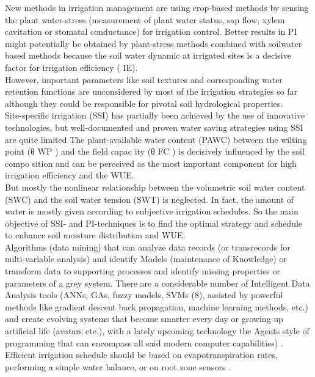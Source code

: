 \documentclass[letterpaper, 10 pt, conference]{ieeeconf}  %
\begin{document}
New methods in irrigation management are using crop-based methods by sensing the plant water-stress (measurement of plant water status, sap flow, xylem cavitation or stomatal conductance) for irrigation control. Better results in PI might potentially be obtained by plant-stress methods combined with soilwater based methods because the soil water dynamic at irrigated sites is a decisive factor for irrigation efficiency ( IE)\cite{Grashey-Jansen2014}.\\
However, important parameters like soil textures and corresponding water retention functions are unconsidered by most of the irrigation strategies so far although they could be responsible for pivotal soil hydrological properties\cite{Grashey-Jansen2014}.\\
Site-specific irrigation (SSI) has partially been achieved by the use of innovative technologies, but well-documented and proven water saving strategies using SSI are quite limited
The plant-available water content (PAWC) between the wilting point (θ WP ) and the field capac ity (θ FC ) is decisively influenced by the soil compo sition and can be perceived as the most important component for high irrigation efficiency and the WUE\cite{Grashey-Jansen2014}.\\

But mostly the nonlinear relationship between the volumetric soil water content (SWC) and the soil water tension (SWT) is neglected. In fact, the amount of water is mostly given according to subjective irrigation schedules. So the main objective of SSI- and PI-techniques is to find the optimal strategy and schedule to enhance soil moisture distribution and WUE\cite{Grashey-Jansen2014}.\\

Algorithms (data mining) that can analyze data records (or transrecords for nulti-variable analysis) and identify Models (maintenance of Knowledge) or transform data to supporting processes and identify missing properties or parameters of a grey system. There are a considerable number of Intelligent Data Analysis tools (ANNs, GAs, fuzzy models, SVMs (8), assisted by powerful methods like gradient descent back propagation, machine learning methods, etc.) and create evolving systems that become smarter every day or growing up artificial life (avatars etc.), with a lately upcoming technology the Agents style of programming that can encompass all said modern computer capabilities) \cite{Li}.\\


Efficient irrigation schedule should be based on evapotranspiration rates, performing a simple water balance, or on root zone sensors \cite{Li}.\\
\end{document}
